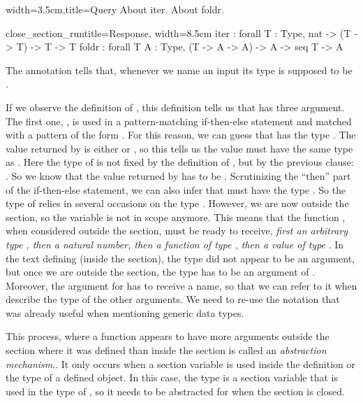 \begin{coq}{}{width=3.5cm,title=Query}
About iter.
About foldr.
$~$
\end{coq}
\begin{coqout}{close_section_run}{title=Response, width=8.5cm}
iter : forall T : Type, nat -> (T -> T) -> T -> T
foldr :
  forall T A : Type, (T -> A -> A) -> A -> seq T -> A
\end{coqout}
The  annotation tells \Coq{} that, whenever we name
an input  its type is supposed to be .

If we observe the definition of , this definition tells us
that  has three argument.  The first one, , is used in
a pattern-matching if-then-else statement and matched with a pattern of the
form .  For this reason, we can guess that  has the type .
The value returned by  is either  or , so this
tells us the value must have the same type as .  Here the type of 
 is not fixed by the definition of , but by the previous clause:
.  So we know that the value returned by 
has to be .  Scrutinizing the ``then'' part of the if-then-else statement,
we can also infer that  must have the type .  So the type
of  relies in several occasions on the type .  However, we are
now outside the section, so the variable  is not in
scope anymore.  This means that the function , when considered
outside the section, must be ready to receive, {\em first an arbitrary type
 , then a natural number, then a function of type , then a
value of type }.  In the text defining  (inside the section), the
type  did not appear to be an argument, but once we are outside
the section, the type  has to be an argument of .  Moreover,
the argument for  has to receive a name, so that we can refer to it when
describe the type of the other arguments.  We need to re-use the 
notation that was already useful when mentioning generic data types.

This process, where a function appears to have more arguments outside
the section where it was defined than inside the section is called
an {\em abstraction mechanism}..
It only occurs when a section variable is used inside the definition or
the type of a defined object.  In this case, the type  is a section
variable that is used in the type of , so it needs to be
abstracted for  when the section is closed.

